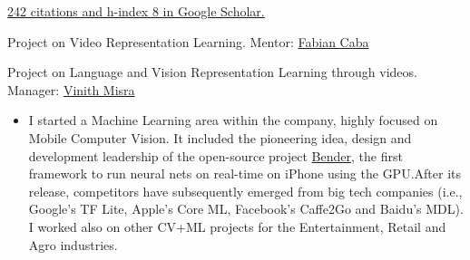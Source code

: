 \documentclass[10pt,a4paper,academicons]{altacv}
\begin{document}
\href{https://scholar.google.com/citations?user=i2LNBfUAAAAJ}{242 citations and h-index 8 in Google Scholar.}

\vspace{3mm}

\nocite{*}

{
\hypersetup{hidelinks}

\printbibliography[heading=pubtype,title={\printinfo{\faGroup}{Conference Proceedings}},type=inproceedings]

\pagebreak


\printbibliography[heading=pubtype,title={\printinfo{\faBook}{Journal Articles}},type=article]

\printbibliography[heading=pubtype,title={\printinfo{\faGraduationCap}{Theses}},type=thesis]

\printbibliography[heading=pubtype,title={\printinfo{\faGroup}{Workshop Proceedings}},type=incollection]

\printbibliography[heading=pubtype,title={\printinfo{\faAsterisk}{Non Refereed}},type=misc]
}



Project on Video Representation Learning. Mentor: \href{https://fabiancaba.com/}{Fabian Caba}

\divider{}


Project on Language and Vision Representation Learning through videos. Manager: \href{https://vinmisra.github.io/}{Vinith Misra}

\divider{}


\begin{itemize}
  \item I started a Machine Learning area within the company, highly focused on Mobile Computer Vision. It included the pioneering idea, design and development leadership of the open-source project {\href{https://github.com/xmartlabs/Bender}{Bender}}, the first framework to run neural nets on real-time on iPhone using the GPU.\@ After its release, competitors have subsequently emerged from big tech companies (i.e., Google’s TF Lite, Apple’s Core ML, Facebook’s Caffe2Go and Baidu’s MDL). I worked also on other CV+ML projects for the Entertainment, Retail and Agro industries.
\end{itemize}
\end{document}

